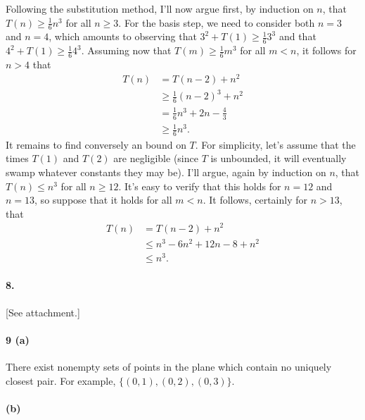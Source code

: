 \documentclass[
]{article}
\begin{document}
Following the substitution method, I'll now argue first, by induction on
\(n\), that \(T(n)\geq \frac{1}{6}n^3\) for all \(n\geq 3\). For the
basis step, we need to consider both \(n=3\) and \(n=4\), which amounts
to observing that \(3^2+T(1) \geq \frac{1}{6}3^3\) and that
\(4^2+T(1) \geq \frac{1}{6}4^3\). Assuming now that
\(T(m)\geq \frac{1}{6}m^3\) for all \(m<n\), it follows for \(n>4\) that
\begin{align*}
  T(n) &= T(n - 2) + n^2\\
       &\geq \frac{1}{6}(n-2)^3 + n^2\\
       &= \frac{1}{6}n^3 + 2n - \frac{4}{3}\\
       &\geq \frac{1}{6}n^3.
\end{align*} It remains to find conversely an bound on \(T\). For
simplicity, let's assume that the times \(T(1)\) and \(T(2)\) are
negligible (since \(T\) is unbounded, it will eventually swamp
whatever constants they may be). I'll argue, again by induction on
\(n\), that \(T(n)\leq n^3\) for all \(n\geq 12\). It's easy to verify
that this holds for \(n=12\) and \(n=13\), so suppose that it holds for
all \(m<n\). It follows, certainly for \(n>13\), that \begin{align*}
  T(n) &= T(n - 2) + n^2\\
       &\leq n^3 - 6n^2 + 12n - 8 + n^2\\
       &\leq n^3.
\end{align*}

\hypertarget{section-2}{%
\paragraph{8.}\label{section-2}}

{[}See attachment.{]}

\hypertarget{a-5}{%
\paragraph{9 (a)}\label{a-5}}

There exist nonempty sets of points in the plane which contain no
uniquely closest pair. For example, \(\{(0,1),(0,2),(0,3)\}\).

\hypertarget{b-5}{%
\paragraph{(b)}\label{b-5}}
\end{document}
